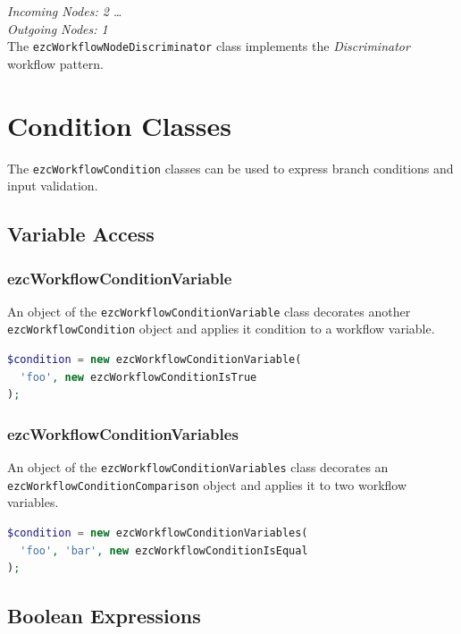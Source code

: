 \emph{Incoming Nodes: 2 \dots *}\\
\emph{Outgoing Nodes: 1}\\

The \texttt{ezcWorkflowNodeDiscriminator} class implements the
\emph{Discriminator} workflow pattern.


\section{Condition Classes}
\label{section-ConditionClasses}

The \texttt{ezcWorkflowCondition} classes can be used to express branch
conditions and input validation.

\subsection{Variable Access}

\subsubsection{ezcWorkflowConditionVariable}

An object of the \texttt{ezcWorkflowConditionVariable} class decorates another\\
\texttt{ezcWorkflowCondition} object and applies it condition to a workflow
variable.

\begin{lstlisting}[language=PHP]
$condition = new ezcWorkflowConditionVariable(
  'foo', new ezcWorkflowConditionIsTrue
);
\end{lstlisting}

\subsubsection{ezcWorkflowConditionVariables}

An object of the \texttt{ezcWorkflowConditionVariables} class decorates an\\
\texttt{ezcWorkflowConditionComparison} object and applies it to two workflow
variables.

\begin{lstlisting}[language=PHP]
$condition = new ezcWorkflowConditionVariables(
  'foo', 'bar', new ezcWorkflowConditionIsEqual
);
\end{lstlisting}

\subsection{Boolean Expressions}

